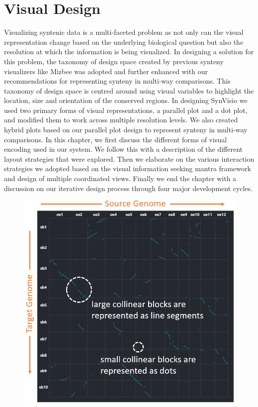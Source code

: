 \chapter{Visual Design}

Visualizing syntenic data is a multi-faceted problem as not only can the visual representation change based on the underlying biological question but also the resolution at which the information is being visualized. In designing a solution for this problem, the taxonomy of design space created by previous synteny visualizers like Mizbee \cite{Meyer2009} was adopted and further enhanced with our recommendations for representing synteny in multi-way comparisons. This taxonomy of design space is centred around using visual variables to highlight the location, size and orientation of the conserved regions. In designing SynVisio we used two primary forms of visual representations, a parallel plot and a dot plot, and modified them to work across multiple resolution levels. We also created hybrid plots based on our parallel plot design to represent synteny in multi-way comparisons. In this chapter, we first discuss the different forms of visual encoding used in our system. We follow this with a  description of the different layout strategies that were explored. Then we elaborate on the various interaction strategies we adopted based on the visual information seeking mantra framework and design of multiple coordinated views. Finally we end the chapter with a discussion on our iterative design process through four major development cycles.

\begin{figure}[h]
  \centering
  \includegraphics[width=.475\linewidth]{images/ch_4_dot_plot_a.PNG}
  \label{fig:ch_4_dot_plot_a}
\end{figure}


